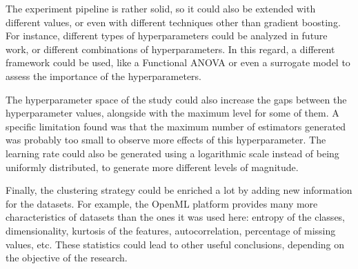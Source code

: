 The experiment pipeline is rather solid, so it could also be extended with different values, or even with different techniques other than gradient boosting. For instance, different types of hyperparameters could be analyzed in future work, or different combinations of hyperparameters. In this regard, a different framework could be used, like a Functional ANOVA or even a surrogate model to assess the importance of the hyperparameters.

The hyperparameter space of the study could also increase the gaps between the hyperparameter values, alongside with the maximum level for some of them. A specific limitation found was that the maximum number of estimators generated was probably too small to observe more effects of this hyperparameter. The learning rate could also be generated using a logarithmic scale instead of being uniformly distributed, to generate more different levels of magnitude.

Finally, the clustering strategy could be enriched a lot by adding new information for the datasets. For example, the OpenML platform provides many more characteristics of datasets than the ones it was used here: entropy of the classes, dimensionality, kurtosis of the features, autocorrelation, percentage of missing values, etc. These statistics could lead to other useful conclusions, depending on the objective of the research. 